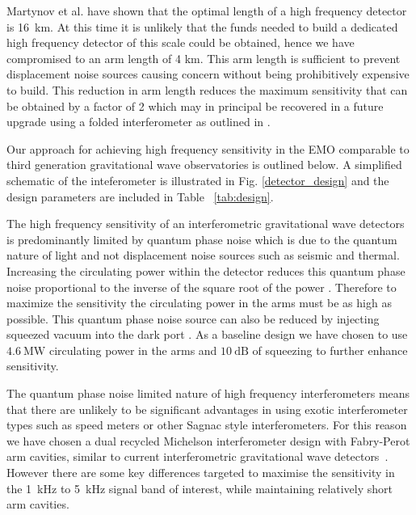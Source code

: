 \documentclass[prx,superscriptaddress,twocolumn,nopreprintnumbers,floatfix,nofootinbib]{revtex4}
\begin{document}
Martynov et al.\cite{martynov19} have shown that the optimal length of a high frequency detector is 16~km. At this time it is unlikely that the funds needed to build a dedicated high frequency detector of this scale could be obtained, hence we have compromised to an arm length of 4 km. This arm length is sufficient to prevent displacement noise sources causing concern without being prohibitively expensive to build. This reduction in arm length reduces the maximum sensitivity that can be obtained by a factor of 2 which may in principal be recovered in a future upgrade using a folded interferometer as outlined in \cite{ballmer2013new}. 

Our approach for achieving high frequency sensitivity in the EMO comparable to third generation gravitational wave observatories is outlined below. A simplified schematic of the inteferometer is illustrated in Fig. \ref{detector_design} and the design parameters are included in Table ~\ref{tab:design}.

The high frequency sensitivity of an interferometric gravitational wave detectors is predominantly limited by quantum phase noise which is due to the quantum nature of light and not displacement noise sources such as seismic and thermal. Increasing the circulating power within the detector reduces this quantum phase noise proportional to the inverse of the square root of the power \cite{martynov19}.  Therefore to maximize the sensitivity the circulating power in the arms must be as high as possible. This quantum phase noise source can also be reduced by injecting squeezed vacuum into the dark port \cite{aasi2013enhanced}. As a baseline design we have chosen to use $4.6~\mathrm{MW}$ circulating power in the arms and $10~\mathrm{dB}$ of squeezing to further enhance sensitivity. 

The quantum phase noise limited nature of high frequency interferometers means that there are unlikely to be significant advantages in using exotic interferometer types such as speed meters or other Sagnac style interferometers. For this reason we have chosen a dual recycled Michelson interferometer design with Fabry-Perot arm cavities, similar to current interferometric gravitational wave detectors~\cite{aasi2015advanced,acernese2014advanced,aso2013interferometer}. However there are some key differences targeted to maximise the sensitivity in the 1~kHz to 5~kHz signal band of interest, while maintaining relatively short arm cavities.
\end{document}

